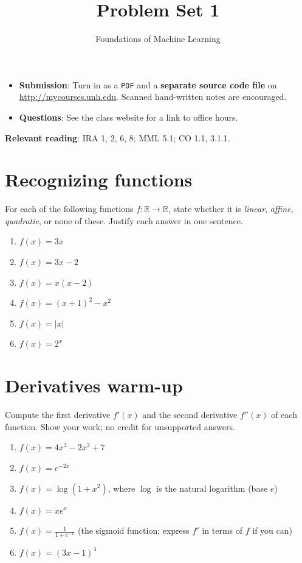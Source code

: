 \documentclass[letterpaper]{article}
\title{Problem Set 1}
\author{Foundations of Machine Learning}
\date{}
\newcommand{\Real}{\mathbb{R}}
\begin{document}
\maketitle

\begin{itemize}
\item \textbf{Submission}: Turn in as a \texttt{PDF} and a \textbf{separate source code file} on \url{http://mycourses.unh.edu}. Scanned hand-written notes are encouraged.
\item \textbf{Questions}: See the class website for a link to office hours.
\end{itemize}

\textbf{Relevant reading}: IRA 1, 2, 6, 8; MML 5.1; CO 1.1, 3.1.1.  

\section{Recognizing functions}
For each of the following functions $f\colon \Real \to \Real$, state whether it is \emph{linear}, \emph{affine}, \emph{quadratic}, or none of these. Justify each answer in one sentence.
\begin{enumerate}
\item $f(x) = 3x$
\item $f(x) = 3x - 2$
\item $f(x) = x(x-2)$
\item $f(x) = (x+1)^2 - x^2$
\item $f(x) = |x|$
\item $f(x) = 2^x$
\end{enumerate}

\section{Derivatives warm-up}
Compute the first derivative $f'(x)$ and the second derivative $f''(x)$ of each function. Show your work; no credit for unsupported answers.
\begin{enumerate}
\item $f(x) = 4x^3 - 2x^2 + 7$
\item $f(x) = e^{-2x}$
\item $f(x) = \log(1 + x^2)$, where $\log$ is the natural logarithm (base $e$)
\item $f(x) = x e^{x}$
\item $f(x) = \frac{1}{1 + e^{-x}}$ \quad (the sigmoid function; express $f'$ in terms of $f$ if you can)
\item $f(x) = (3x - 1)^4$
\end{enumerate}
\end{document}
